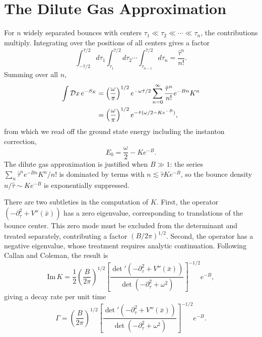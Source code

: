 \section{The Dilute Gas Approximation}

For $n$ widely separated bounces with centers
$\tau_1 \ll \tau_2 \ll \cdots \ll \tau_n$, the contributions
multiply. Integrating over the positions of all centers gives a factor
\begin{equation}
    \int_{-\hat\tau/2}^{\hat\tau/2}d\tau_1
    \int_{\tau_1}^{\hat\tau/2}d\tau_2\cdots
    \int_{\tau_{n-1}}^{\hat\tau/2}d\tau_n
    = \frac{\hat\tau^n}{n!}.
\end{equation}
Summing over all $n$,
\begin{align}
    \int\mathcal{D}x\,e^{-S_E}
    &= \left(\frac{\omega}{\pi}\right)^{1/2}e^{-\omega\hat\tau/2}
    \sum_{n=0}^{\infty}\frac{\hat\tau^n}{n!}e^{-Bn}K^n \notag\\
    &= \left(\frac{\omega}{\pi}\right)^{1/2}
    e^{-\hat\tau(\omega/2 - Ke^{-B})},
\end{align}
from which we read off the ground state energy including the
instanton correction,
\begin{equation}
    \boxed{E_0 = \frac{\omega}{2} - Ke^{-B}.}
\end{equation}
The dilute gas approximation is justified when $B\gg 1$: the series
$\sum_n \hat\tau^n e^{-Bn}K^n/n!$ is dominated by terms with
$n\lesssim \hat\tau Ke^{-B}$, so the bounce density $n/\hat\tau\sim
Ke^{-B}$ is exponentially suppressed.

There are two subtleties in the computation of $K$. First, the
operator $(-\partial_\tau^2 + V''(\bar x))$ has a zero eigenvalue,
corresponding to translations of the bounce center. This zero mode
must be excluded from the determinant and treated separately,
contributing a factor $(B/2\pi)^{1/2}$. Second, the operator has a
negative eigenvalue, whose treatment requires analytic continuation.
Following Callan and Coleman, the result is
\begin{equation}
    \text{Im}\,K = \frac{1}{2}\left(\frac{B}{2\pi}\right)^{1/2}
    \left[\frac{\det'(-\partial_\tau^2+V''(\bar x))}
    {\det(-\partial_\tau^2+\omega^2)}\right]^{-1/2}e^{-B},
\end{equation}
giving a decay rate per unit time
\begin{equation}
    \Gamma = \left(\frac{B}{2\pi}\right)^{1/2}
    \left[\frac{\det'(-\partial_\tau^2+V''(\bar x))}
    {\det(-\partial_\tau^2+\omega^2)}\right]^{-1/2}e^{-B}.
\end{equation}

